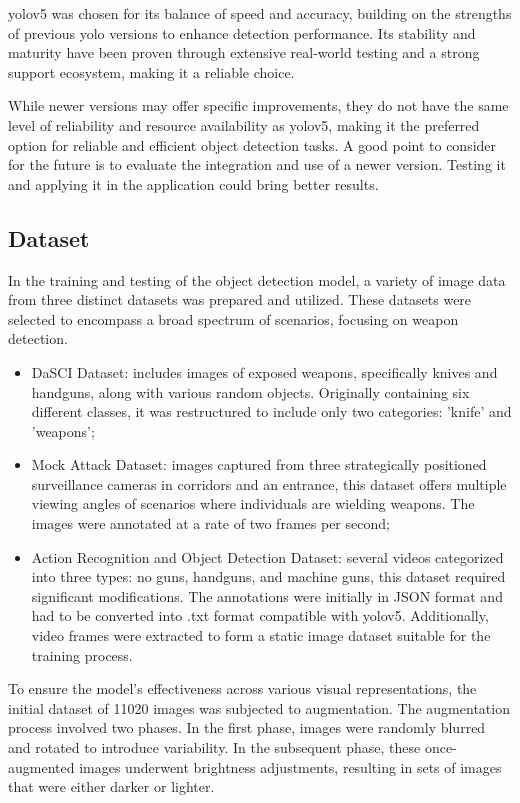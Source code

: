 \ac{yolo}v5 was chosen for its balance of speed and accuracy, building on the strengths of previous \ac{yolo} versions to 
enhance detection performance.  Its stability and maturity have been proven through extensive real-world testing 
and a strong support ecosystem, making it a reliable choice. 

While newer versions may offer specific improvements, they do not have the same level of reliability and 
resource availability as \ac{yolo}v5, making it the preferred option for reliable and efficient object detection tasks.
A good point to consider for the future is to evaluate the integration and use of a newer version. Testing it and 
applying it in the application could bring better results.

\subsection{Dataset} 
In the training and testing of the object detection model, a variety of image data from three distinct datasets was 
prepared and utilized. These datasets were selected to encompass a broad spectrum of scenarios, focusing on weapon 
detection.

\begin{itemize}
    \item DaSCI Dataset: includes images of exposed weapons, specifically knives and handguns, along with various 
    random objects. Originally containing six different classes, it was restructured to include only two categories: 
    'knife' and 'weapons';
    \item Mock Attack Dataset: images captured from three strategically positioned surveillance cameras in corridors 
    and an entrance, this dataset offers multiple viewing angles of scenarios where individuals are wielding weapons. 
    The images were annotated at a rate of two frames per second;
    \item Action Recognition and Object Detection Dataset: several videos categorized into three types: no guns, handguns, 
    and machine guns, this dataset required significant modifications. The annotations were initially in JSON 
    format and had to be converted into .txt format compatible with \ac{yolo}v5. Additionally, video frames were extracted 
    to form a static image dataset suitable for the training process.
\end{itemize}

To ensure the model's effectiveness across various visual representations, the initial dataset of 11020 images was 
subjected to augmentation. The augmentation process involved two phases. In the first phase, images were 
randomly blurred and rotated to introduce variability. In the subsequent phase, these once-augmented images underwent 
brightness adjustments, resulting in sets of images that were either darker or lighter.

